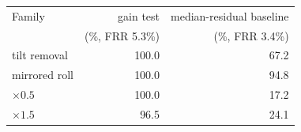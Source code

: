 \begin{tabular}{lrr}
\toprule
Family & gain test & median-residual baseline \\
 & (\%, FRR 5.3\%) & (\%, FRR 3.4\%) \\
\midrule
tilt removal & 100.0 & 67.2 \\
mirrored roll & 100.0 & 94.8 \\
$\times 0.5$ & 100.0 & 17.2 \\
$\times 1.5$ & 96.5 & 24.1 \\
\bottomrule
\end{tabular}
